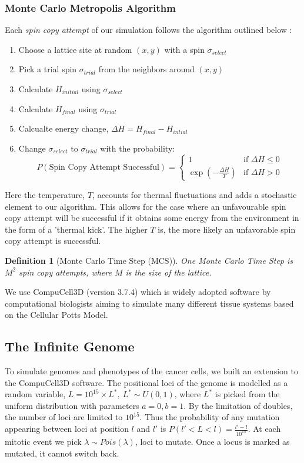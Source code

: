 \documentclass[12pt]{article}
\newtheorem{definition}{Definition}
\begin{document}
\subsubsection{Monte Carlo Metropolis Algorithm}
Each \emph{spin copy attempt} of our simulation follows the algorithm outlined below \cite{Glazier2007}:

\begin{enumerate}
  \item Choose a lattice site at random $(x,y)$ with a spin $\sigma_{select}$
  \item Pick a trial spin $\sigma_{trial}$ from the neighbors around $(x,y)$
  \item Calculate $H_{initial}$ using $\sigma_{select}$
  \item Calculate $H_{final}$ using $\sigma_{trial}$
  \item Calcualte energy change, $\Delta H = H_{final} - H_{intial}$
  \item{ Change $\sigma_{select}$ to $\sigma_{trial}$ with the probability:
  \begin{equation}
 		P(\text{Spin Copy Attempt Successful}) =
  	\begin{cases}
   		1 & \text{if } \Delta H \leq 0 \\
   		\exp{(-\frac{\Delta H}{T})}       & \text{if } \Delta H > 0
  	\end{cases}
  	\label{p_attempt_success}
	\end{equation}
}
\end{enumerate}

Here the temperature, $T$, accounts for thermal fluctuations and adds a stochastic element to our algorithm. This allows for the case where an unfavourable spin copy attempt will be successful if it obtains some energy from the environment in the form of a 'thermal kick'. The higher $T$ is, the more likely an unfavorable spin copy attempt is successful.

\begin{definition}[Monte Carlo Time Step (MCS)] One Monte Carlo Time Step is $M^2$ spin copy attempts, where $M$ is the size of the lattice.
\end{definition}

We use CompuCell3D \cite{Swat2012} (version 3.7.4) which is widely adopted software by computational biologists aiming to simulate many different tissue systems based on the Cellular Potts Model.

\subsection{The Infinite Genome}
To simulate genomes and phenotypes of the cancer cells, we built an extension to the CompuCell3D software. The positional loci of the genome is modelled as a random variable, $L = 10^{15}\times L^*,~L^* \sim U(0,1)$, where $L^*$ is picked from the uniform distribution with parameters $a=0, b=1$. By the limitation of doubles, the number of loci are limited to $10^{15}$. Thus the probability of any mutation appearing between loci at position $l$ and $l'$ is $P( l' < L < l) = \frac{l' - l}{10^{15}}$. At each mitotic event we pick $\lambda \sim Pois(\lambda)$, loci to mutate. Once a locus is marked as mutated, it cannot switch back.
\end{document}
